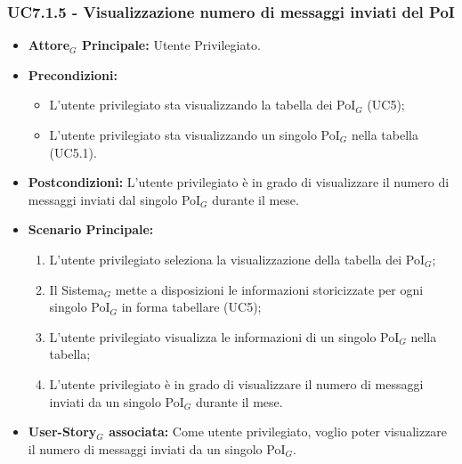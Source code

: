 \documentclass[10pt]{article}
\begin{document}
\begin{justify}
\subsubsection{\textbf{UC7.1.5 - Visualizzazione numero di messaggi inviati del PoI}}
\label{UC7.1.5}
\begin{itemize}
    \item \textbf{Attore$_G$ Principale:} Utente Privilegiato.
    \item \textbf{Precondizioni:} 
        \begin{itemize}
          \item L'utente privilegiato sta visualizzando la tabella dei PoI$_G$ (UC5);
            \item L'utente privilegiato sta visualizzando un singolo PoI$_G$ nella tabella (UC5.1).
        \end{itemize}
      \item \textbf{Postcondizioni:} L'utente privilegiato è in grado di visualizzare il numero di messaggi inviati dal singolo PoI$_G$ durante il mese.
    \item \textbf{Scenario Principale:} 
        \begin{enumerate}
        \item L'utente privilegiato seleziona la visualizzazione della tabella dei PoI$_G$;
          \item Il Sistema$_G$ mette a disposizioni le informazioni storicizzate per ogni singolo PoI$_G$ in forma tabellare (UC5);
          \item L'utente privilegiato visualizza le informazioni di un singolo PoI$_G$ nella tabella;
            \item L'utente privilegiato è in grado di visualizzare il numero di messaggi inviati da un singolo PoI$_G$ durante il mese.
        \end{enumerate}
    \item \textbf{User-Story$_G$ associata:} Come utente privilegiato, voglio poter visualizzare il numero di messaggi inviati da un singolo PoI$_G$.
\end{itemize}


\end{justify}
\end{document}
